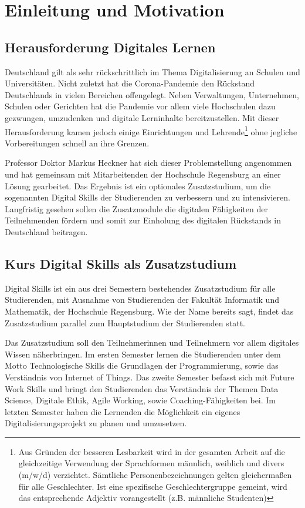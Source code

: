\section{Einleitung und Motivation}\label{einleitung}
\subsection{Herausforderung Digitales Lernen}\label{herausforderung}
Deutschland gilt als sehr rückschrittlich im Thema Digitalisierung an Schulen
und Universitäten. Nicht zuletzt hat die Corona-Pandemie den Rückstand
Deutschlands in vielen Bereichen offengelegt. Neben Verwaltungen, Unternehmen,
Schulen oder Gerichten hat die Pandemie vor allem viele Hochschulen dazu
gezwungen, umzudenken und digitale Lerninhalte bereitzustellen. Mit dieser
Herausforderung kamen jedoch einige Einrichtungen und Lehrende\footnote{Aus
Gründen der besseren Lesbarkeit wird in der gesamten Arbeit auf die
gleichzeitige Verwendung der Sprachformen männlich, weiblich und divers (m/w/d)
verzichtet. Sämtliche Personenbezeichnungen gelten gleichermaßen für alle
Geschlechter. Ist eine spezifische Geschlechtergruppe gemeint, wird das
entsprechende Adjektiv vorangestellt (z.B. \glqq männliche Studenten\grqq)} ohne
jegliche Vorbereitungen schnell an ihre Grenzen. \parencite{bmwi-rueckstand}

Professor Doktor Markus Heckner hat sich dieser Problemstellung angenommen und
hat gemeinsam mit Mitarbeitenden der Hochschule Regensburg an einer Lösung
gearbeitet. Das Ergebnis ist ein optionales Zusatzstudium, um die sogenannten
\glqq Digital Skills\grqq{} der Studierenden zu verbessern und zu intensivieren.
Langfristig gesehen sollen die Zusatzmodule die digitalen Fähigkeiten der
Teilnehmenden fördern und somit zur Einholung des digitalen Rückstands in
Deutschland beitragen.

\subsection{Kurs Digital Skills als Zusatzstudium}\label{kurs-digital-skills}
Digital Skills ist ein aus drei Semestern bestehendes Zusatzstudium für alle
Studierenden, mit Ausnahme von Studierenden der Fakultät Informatik und
Mathematik, der Hochschule Regensburg. Wie der Name bereits sagt, findet das
Zusatzstudium parallel zum Hauptstudium der Studierenden statt.

Das Zusatzstudium soll den Teilnehmerinnen und Teilnehmern vor allem digitales
Wissen näherbringen. Im ersten Semester lernen die Studierenden unter dem Motto
\glqq Technologische Skills\grqq{} die Grundlagen der Programmierung, sowie das
Verständnis von Internet of Things. Das zweite Semester befasst sich mit
\glqq Future Work Skills\grqq{} und bringt den Studierenden das Verständnis der
Themen \glqq Data Science\grqq{}, \glqq Digitale Ethik\grqq{},
\glqq Agile Working\grqq{}, sowie \glqq Coaching-Fähigkeiten\grqq{} bei. Im
letzten Semester haben die Lernenden die Möglichkeit ein eigenes
Digitalisierungsprojekt zu planen und umzusetzen.

